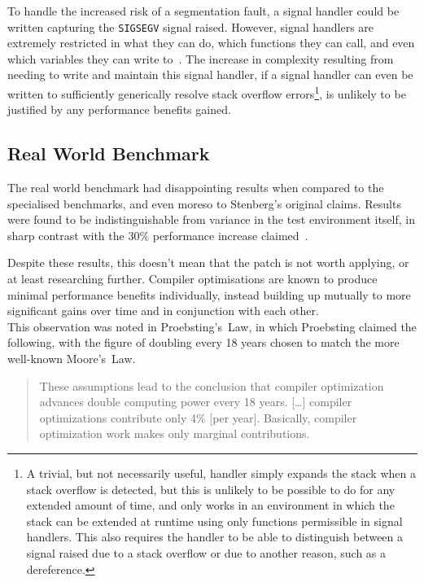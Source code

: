 To handle the increased risk of a segmentation fault, a signal handler could be written capturing the \texttt{SIGSEGV} signal raised. However, signal handlers are extremely restricted in what they can do, which functions they can call, and even which variables they can write to~\cite{signalhandling}. The increase in complexity resulting from needing to write and maintain this signal handler, if a signal handler can even be written to sufficiently generically resolve stack overflow errors\footnote{A trivial, but not necessarily useful, handler simply expands the stack when a stack overflow is detected, but this is unlikely to be possible to do for any extended amount of time, and only works in an environment in which the stack can be extended at runtime using only functions permissible in signal handlers. This also requires the handler to be able to distinguish between a signal raised due to a stack overflow or due to another reason, such as a  dereference.}, is unlikely to be justified by any performance benefits gained.

\subsection{Real World Benchmark}

The real world benchmark had disappointing results when compared to the specialised benchmarks, and even moreso to Stenberg's original claims. Results were found to be indistinguishable from variance in the test environment itself, in sharp contrast with the 30\% performance increase claimed~\cite{curlmalloc}.

Despite these results, this doesn't mean that the patch is not worth applying, or at least researching further. Compiler optimisations are known to produce minimal performance benefits individually, instead building up mutually to more significant gains over time and in conjunction with each other.\\
This observation was noted in Proebsting's~Law, in which Proebsting claimed the following, with the figure of doubling every 18 years chosen to match the more well-known Moore's~Law.

\begin{quote}
	These assumptions lead to the conclusion that compiler optimization advances double computing power every 18 years. […] compiler optimizations contribute only 4\% [per year]. Basically, compiler optimization work makes only marginal contributions.~\cite{proebstingdecl}
\end{quote}


